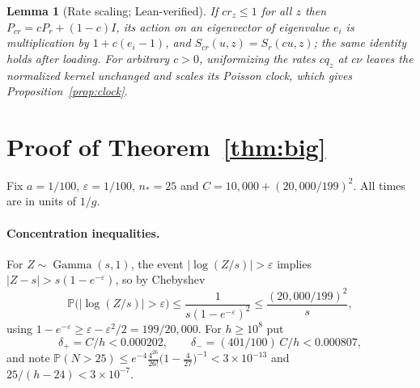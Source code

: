 \documentclass[11pt,a4paper]{article}
\theoremstyle{plain}
\newtheorem{lemma}[theorem]{Lemma}
\theoremstyle{definition}
\theoremstyle{remark}
\newcommand{\Prob}{\mathbb P}
\newcommand{\eps}{\varepsilon}
\DeclareMathOperator{\Gam}{Gamma}
\begin{document}
\begin{lemma}[Rate scaling; Lean-verified]\label{lem:scaling}
If $cr_z\le1$ for all $z$ then $P_{cr}=cP_r+(1-c)I$, its action on an eigenvector of eigenvalue $e_i$ is multiplication by $1+c(e_i-1)$, and $S_{cr}(u,z)=S_r(cu,z)$; the same identity holds after loading. For arbitrary $c>0$, uniformizing the rates $cq_z$ at $c\nu$ leaves the normalized kernel unchanged and scales its Poisson clock, which gives Proposition~\ref{prop:clock}.
\end{lemma}

\section{Proof of Theorem~\ref{thm:big}}\label{app:big}
Fix $a=1/100$, $\eps=1/100$, $n_*=25$ and $C=10{,}000+(20{,}000/199)^2$. All times are in units of $1/g$.

\paragraph{Concentration inequalities.} For $Z\sim\Gam(s,1)$, the event $|\log(Z/s)|>\eps$ implies $|Z-s|>s(1-e^{-\eps})$, so by Chebyshev
\begin{equation}\label{eq:gammacheb}
\Prob\bigl(|\log(Z/s)|>\eps\bigr)\le\frac{1}{s(1-e^{-\eps})^2}\le\frac{(20{,}000/199)^2}{s},
\end{equation}
using $1-e^{-\eps}\ge\eps-\eps^2/2=199/20{,}000$. For $h\ge10^{8}$ put
\begin{equation}\label{eq:deltas}
\delta_+=C/h<0.000202,\qquad\delta_-=(401/100)\,C/h<0.000807,
\end{equation}
and note $\Prob(N>25)\le e^{-4}\frac{4^{26}}{26!}\bigl(1-\frac4{27}\bigr)^{-1}<3\times10^{-13}$ and $25/(h-24)<3\times10^{-7}$.
\end{document}
